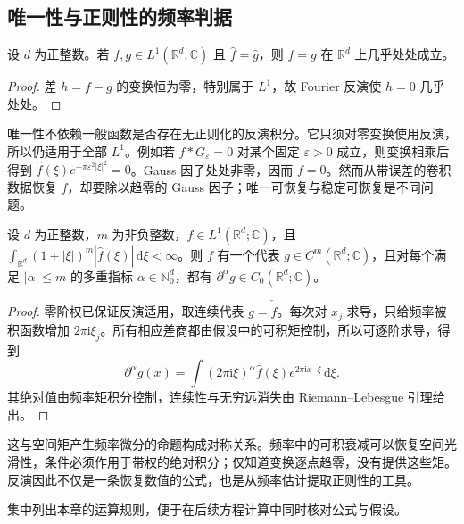 \subsection{唯一性与正则性的频率判据}
\label{b2:subsec:030504}

\begin{corollary}[唯一性]\label{b2:cor:03-uniqueness}
设 \(d\) 为正整数。若 \(f,g\in L^1(\mathbb R^d;\mathbb C)\) 且 \(\widehat f=\widehat g\)，则 \(f=g\) 在 \(\mathbb R^d\) 上几乎处处成立。
\end{corollary}
\begin{proof}
差 \(h=f-g\) 的变换恒为零，特别属于 \(L^1\)，故 Fourier 反演使 \(h=0\) 几乎处处。
\end{proof}

唯一性不依赖一般函数是否存在无正则化的反演积分。它只须对零变换使用反演，所以仍适用于全部 \(L^1\)。例如若 \(f*G_\varepsilon=0\) 对某个固定 \(\varepsilon>0\) 成立，则变换相乘后得到 \(\widehat f(\xi)e^{-\pi\varepsilon^2|\xi|^2}=0\)。Gauss 因子处处非零，因而 \(f=0\)。然而从带误差的卷积数据恢复 \(f\)，却要除以趋零的 Gauss 因子；唯一可恢复与稳定可恢复是不同问题。



\begin{proposition}\label{b2:prop:03-inverse-regularity}
设 \(d\) 为正整数，\(m\) 为非负整数，\(f\in L^1(\mathbb R^d;\mathbb C)\)，且 \(\int_{\mathbb R^d}(1+|\xi|)^m|\widehat f(\xi)|\,\mathrm{d}\xi<\infty\)。则 \(f\) 有一个代表 \(g\in C^m(\mathbb R^d;\mathbb C)\)，且对每个满足 \(|\alpha|\leq m\) 的多重指标 \(\alpha\in\mathbb N_0^d\)，都有 \(\partial^\alpha g\in C_0(\mathbb R^d;\mathbb C)\)。
\end{proposition}
\begin{proof}
零阶权已保证反演适用，取连续代表 \(g=\check {\widehat f}\)。每次对 \(x_j\) 求导，只给频率被积函数增加 \(2\pi\mathrm{i}\xi_j\)。所有相应差商都由假设中的可积矩控制，所以可逐阶求导，得到
\[
 \partial^\alpha g(x)=\int(2\pi\mathrm{i}\xi)^\alpha\widehat f(\xi)e^{2\pi\mathrm{i}x\cdot\xi}\,\mathrm{d}\xi.
\]
其绝对值由频率矩积分控制，连续性与无穷远消失由 Riemann--Lebesgue 引理给出。
\end{proof}

这与空间矩产生频率微分的命题构成对称关系。频率中的可积衰减可以恢复空间光滑性，条件必须作用于带权的绝对积分；仅知道变换逐点趋零，没有提供这些矩。反演因此不仅是一条恢复数值的公式，也是从频率估计提取正则性的工具。


集中列出本章的运算规则，便于在后续方程计算中同时核对公式与假设。


